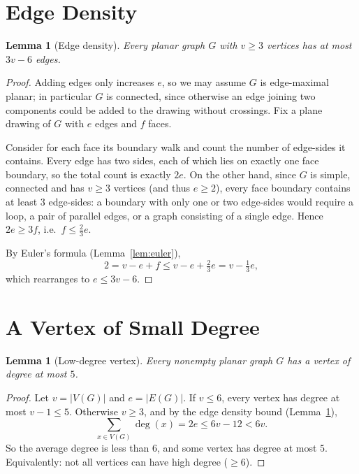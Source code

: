 \documentclass[11pt]{article}
\newtheorem{lemma}[theorem]{Lemma}
\theoremstyle{definition}
\begin{document}
\section{Edge Density}

\begin{lemma}[Edge density]\label{lem:density}
  Every planar graph $G$ with $v \geq 3$ vertices has at most $3v - 6$ edges.
\end{lemma}

\begin{proof}
  Adding edges only increases $e$, so we may assume $G$ is edge-maximal
  planar; in particular $G$ is connected, since otherwise an edge joining
  two components could be added to the drawing without crossings. Fix a
  plane drawing of $G$ with $e$ edges and $f$ faces.

  Consider for each face its boundary walk and count the number of
  edge-sides it contains. Every edge has two sides, each of which lies on
  exactly one face boundary, so the total count is exactly $2e$. On the other
  hand, since $G$ is simple, connected and has $v \geq 3$ vertices (and thus
  $e \geq 2$), every face boundary contains at least $3$ edge-sides: a
  boundary with only one or two edge-sides would require a loop, a pair of
  parallel edges, or a graph consisting of a single edge. Hence
  $2e \geq 3f$, i.e.\ $f \leq \tfrac{2}{3}e$.

  By Euler's formula (Lemma~\ref{lem:euler}),
  \[
    2 = v - e + f \leq v - e + \tfrac{2}{3}e = v - \tfrac{1}{3}e,
  \]
  which rearranges to $e \leq 3v - 6$.
\end{proof}

\section{A Vertex of Small Degree}

\begin{lemma}[Low-degree vertex]\label{lem:lowdeg}
  Every nonempty planar graph $G$ has a vertex of degree at most $5$.
\end{lemma}

\begin{proof}
  Let $v = |V(G)|$ and $e = |E(G)|$. If $v \leq 6$, every vertex has degree
  at most $v - 1 \leq 5$. Otherwise $v \geq 3$, and by the edge density
  bound (Lemma~\ref{lem:density}),
  \[
    \sum_{x \in V(G)} \deg(x) = 2e \leq 6v - 12 < 6v.
  \]
  So the average degree is less than $6$, and some vertex has degree at
  most $5$. Equivalently: not all vertices can have high degree ($\geq 6$).
\end{proof}
\end{document}
